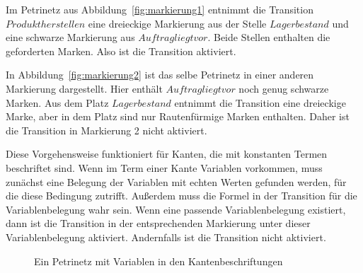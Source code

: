 	Im Petrinetz aus Abbildung~\ref{fig:markierung1} entnimmt die Transition $Produkt herstellen$ eine dreieckige Markierung aus der Stelle $Lagerbestand$ und eine schwarze Markierung aus $Auftrag liegt vor$. Beide Stellen enthalten die geforderten Marken. Also ist die Transition aktiviert.

	In Abbildung~\ref{fig:markierung2} ist das selbe Petrinetz in einer anderen Markierung dargestellt. Hier enthält $Auftrag liegt vor$ noch genug schwarze Marken. Aus dem Platz $Lagerbestand$ entnimmt die Transition eine dreieckige Marke, aber in dem Platz sind nur Rautenfürmige Marken enthalten. Daher ist die Transition in Markierung 2 nicht aktiviert.

	Diese Vorgehensweise funktioniert für Kanten, die mit konstanten Termen beschriftet sind. Wenn im Term einer Kante Variablen vorkommen, muss zunächst eine Belegung der Variablen mit echten Werten gefunden werden, für die diese Bedingung zutrifft. Außerdem muss die Formel in der Transition für die Variablenbelegung wahr sein. Wenn eine passende Variablenbelegung existiert, dann ist die Transition in der entsprechenden Markierung unter dieser Variablenbelegung aktiviert. Andernfalls ist die Transition nicht aktiviert.

	\begin{figure}[h]
		\centering
		\caption{Ein Petrinetz mit Variablen in den Kantenbeschriftungen}
		\label{fig:figure1}
	\end{figure}



















































